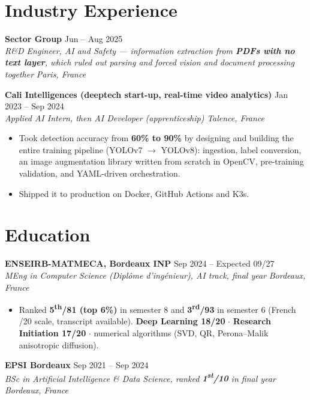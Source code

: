 \documentclass[10pt, letterpaper]{article}
\newcommand{\entry}[4]{%
  \noindent \textbf{#1} \hfill #2 \\
  \textit{#3} \hfill \textit{#4} \par
}
\begin{document}
\section{Industry Experience}

\entry{Sector Group}{Jun -- Aug 2025}{R\&D Engineer, AI and Safety --- information extraction from \textbf{PDFs with no text layer}, which ruled out parsing and forced vision and document processing together}{Paris, France}

\vspace{1pt}

\entry{Cali Intelligences (deeptech start-up, real-time video analytics)}{Jan 2023 -- Sep 2024}%
{Applied AI Intern, then AI Developer (apprenticeship)}{Talence, France}
\begin{itemize}
    \item Took detection accuracy from \textbf{60\% to 90\%} by designing and building the entire training pipeline (YOLOv7 $\to$ YOLOv8): ingestion, label conversion, an image augmentation library written from scratch in OpenCV, pre-training validation, and YAML-driven orchestration.
    \item Shipped it to production on Docker, GitHub Actions and K3s.
\end{itemize}

\section{Education}

\entry{ENSEIRB-MATMECA, Bordeaux INP}{Sep 2024 -- Expected 09/27}%
{MEng in Computer Science (\textit{Diplôme d'ingénieur}), AI track, final year}{Bordeaux, France}
\begin{itemize}
    \item Ranked \textbf{5\textsuperscript{th}/81 (top 6\%)} in semester 8 and \textbf{3\textsuperscript{rd}/93} in semester 6 (French /20 scale, transcript available). \textbf{Deep Learning 18/20} $\cdot$ \textbf{Research Initiation 17/20} $\cdot$ numerical algorithms (SVD, QR, Perona--Malik anisotropic diffusion).
\end{itemize}

\vspace{1pt}

\entry{EPSI Bordeaux}{Sep 2021 -- Sep 2024}%
{BSc in Artificial Intelligence \& Data Science, ranked \textbf{1\textsuperscript{st}/10} in final year}{Bordeaux, France}
\end{document}
